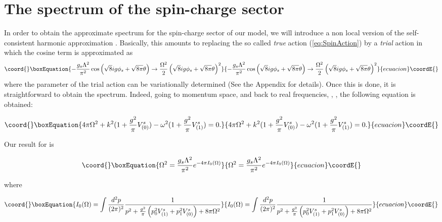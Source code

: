 \documentclass[a4paper,a4paper]{article}
\begin{document}
\section{The spectrum of the spin-charge sector}

In order to obtain the approximate spectrum for the spin-charge sector of our model,
we will introduce a non local version of the self-consistent harmonic approximation
\cite{SCHA}. Basically, this amounts to replacing the so called {\em true} action
(\ref{eq:SpinAction}) by a {\em trial} action in which the cosine term is approximated
as
\begin{equation}\coord{}\boxEquation{
-\frac{g_s\Lambda^2}{\pi^2}
\cos\left(\sqrt{8}ig\phi_s+\sqrt{8\pi}\theta\right)\rightarrow \frac{\Omega^2}{2}
\left(\sqrt{8}ig\phi_s+\sqrt{8\pi}\theta\right)^2
}{
-\frac{g_s\Lambda^2}{\pi^2}
\cos\left(\sqrt{8}ig\phi_s+\sqrt{8\pi}\theta\right)\rightarrow \frac{\Omega^2}{2}
\left(\sqrt{8}ig\phi_s+\sqrt{8\pi}\theta\right)^2
}{ecuacion}\coordE{}\end{equation}
where the parameter \myHighlight{$\Omega$}\coordHE{} of the trial action can be variationally determined (See
the Appendix for details). Once this is done, it is straightforward to obtain the
spectrum. Indeed, going to momentum space, and back to real frequencies,
\coordHE{}, \coordHE{}, the following equation is obtained:

\begin{equation}\coord{}\boxEquation{\label{eq:spectrum}
4\pi\Omega^2 + k^2(1+\frac{g^2}{\pi}V^s_{(0)})
-\omega^2(1+\frac{g^2}{\pi}V^s_{(1)})=0.
}{4\pi\Omega^2 + k^2(1+\frac{g^2}{\pi}V^s_{(0)})
-\omega^2(1+\frac{g^2}{\pi}V^s_{(1)})=0.
}{ecuacion}\coordE{}\end{equation}

Our result for \myHighlight{$\Omega$}\coordHE{} is

\begin{equation}\coord{}\boxEquation{\label{gap}
\Omega^2=\frac{g_s\Lambda^2}{\pi^2} e^{-4\pi I_0(\Omega)}
}{\Omega^2=\frac{g_s\Lambda^2}{\pi^2} e^{-4\pi I_0(\Omega)}
}{ecuacion}\coordE{}\end{equation}

where

\begin{equation}\coord{}\boxEquation{
I_{0}(\Omega)=\int\frac{d^2p}{(2\pi)^2}\frac{1}{p^2+\frac{g^2}{\pi}\left(p_0^2
V^s_{(1)}+p_1^2 V^s_{(0)}\right) + 8\pi\Omega^2}
}{
I_{0}(\Omega)=\int\frac{d^2p}{(2\pi)^2}\frac{1}{p^2+\frac{g^2}{\pi}\left(p_0^2
V^s_{(1)}+p_1^2 V^s_{(0)}\right) + 8\pi\Omega^2}
}{ecuacion}\coordE{}\end{equation}
\end{document}
